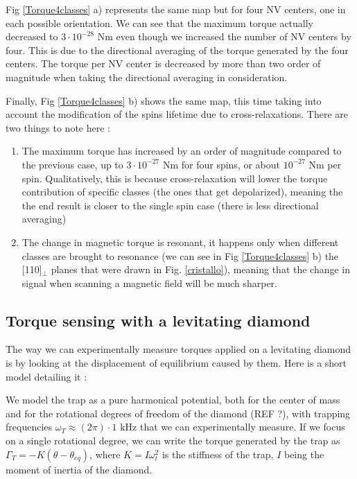 \documentclass[preprintnumbers,amsmath,amssymb,onecolumn,12pt]{revtex4}
\begin{document}
Fig \ref{Torque4classes} a) represents the same map but for four NV centers, one in each possible orientation. We can see that the maximum torque actually decreased to $3\cdot 10^{-28}$ Nm even though we increased the number of NV centers by four. This is due to the directional averaging of the torque generated by the four centers. The torque per NV center is decreased by more than two order of magnitude when taking the directional averaging in consideration.

Finally, Fig \ref{Torque4classes} b) shows the same map, this time taking into account the modification of the spins lifetime due to cross-relaxations. There are two things to note here : 
\begin{enumerate}
\item The maximum torque has increased by an order of magnitude compared to the previous case, up to $3\cdot 10^{-27}$ Nm for four spins, or about $10^{-27}$ Nm per spin. Qualitatively, this is because cross-relaxation will lower the torque contribution of specific classes (the ones that get depolarized), meaning the the end result is closer to the single spin case (there is less directional averaging)
\item The change in magnetic torque is resonant, it happens only when different classes are brought to resonance (we can see in Fig \ref{Torque4classes} b) the [110]$_\perp$ planes that were drawn in Fig. \ref{cristallo}), meaning that the change in signal when scanning a magnetic field will be much sharper.
\end{enumerate} 

\subsection{Torque sensing with a levitating diamond}

The way we can experimentally measure torques applied on a levitating diamond is by looking at the displacement of equilibrium caused by them. Here is a short model detailing it :

We model the trap as a pure harmonical potential, both for the center of mass and for the rotational degrees of freedom of the diamond (REF ?), with trapping frequencies $\omega_T \approx (2\pi) \cdot 1$ kHz that we can experimentally measure. If we focus on a single rotational degree, we can write the torque generated by the trap as $\Gamma_T=-K(\theta-\theta_{eq})$, where $K=I \omega_t^2$ is the stiffness of the trap, $I$ being the moment of inertia of the diamond.
\end{document}
